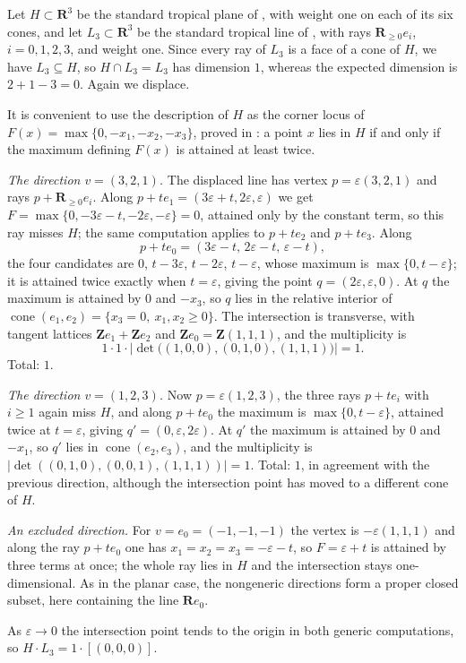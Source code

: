 \begin{example}
\label{ex:ch10-plane-line-r3}
Let $H\subset\mathbf R^3$ be the standard tropical plane of
, with weight one on each of its six cones, and
let $L_3\subset\mathbf R^3$ be the standard tropical line of
, with rays $\mathbf R_{\geq0}e_i$,
$i=0,1,2,3$, and weight one.  Since every ray of $L_3$ is a face of a cone of
$H$, we have $L_3\subseteq H$, so $H\cap L_3=L_3$ has dimension $1$, whereas
the expected dimension is $2+1-3=0$.  Again we displace.

It is convenient to use the description of $H$ as the corner locus of
$F(x)=\max\{0,-x_1,-x_2,-x_3\}$, proved in
: a point $x$ lies in $H$ if and only if the
maximum defining $F(x)$ is attained at least twice.

\emph{The direction $v=(3,2,1)$.}  The displaced line has vertex
$p=\varepsilon(3,2,1)$ and rays $p+\mathbf R_{\geq0}e_i$.  Along
$p+te_1=(3\varepsilon+t,2\varepsilon,\varepsilon)$ we get
$F=\max\{0,-3\varepsilon-t,-2\varepsilon,-\varepsilon\}=0$, attained only by
the constant term, so this ray misses $H$; the same computation applies to
$p+te_2$ and $p+te_3$.  Along
\[
 p+te_0=(3\varepsilon-t,\,2\varepsilon-t,\,\varepsilon-t),
\]
the four candidates are $0$, $t-3\varepsilon$, $t-2\varepsilon$,
$t-\varepsilon$, whose maximum is $\max\{0,t-\varepsilon\}$; it is attained
twice exactly when $t=\varepsilon$, giving the point
$q=(2\varepsilon,\varepsilon,0)$.  At $q$ the maximum is attained by $0$ and
$-x_3$, so $q$ lies in the relative interior of
$\operatorname{cone}(e_1,e_2)=\{x_3=0,\ x_1,x_2\geq0\}$.  The intersection
is transverse, with tangent lattices $\mathbf Ze_1+\mathbf Ze_2$ and
$\mathbf Ze_0=\mathbf Z(1,1,1)$, and the multiplicity is
\[
 1\cdot1\cdot
 \bigl|\det\bigl((1,0,0),(0,1,0),(1,1,1)\bigr)\bigr|
 =1 .
\]
Total: $1$.

\emph{The direction $v=(1,2,3)$.}  Now $p=\varepsilon(1,2,3)$, the three rays
$p+te_i$ with $i\geq1$ again miss $H$, and along $p+te_0$ the maximum is
$\max\{0,t-\varepsilon\}$, attained twice at $t=\varepsilon$, giving
$q'=(0,\varepsilon,2\varepsilon)$.  At $q'$ the maximum is attained by $0$
and $-x_1$, so $q'$ lies in $\operatorname{cone}(e_2,e_3)$, and the
multiplicity is
$|\det((0,1,0),(0,0,1),(1,1,1))|=1$.  Total: $1$, in agreement with the
previous direction, although the intersection point has moved to a different
cone of $H$.

\emph{An excluded direction.}  For $v=e_0=(-1,-1,-1)$ the vertex is
$-\varepsilon(1,1,1)$ and along the ray $p+te_0$ one has
$x_1=x_2=x_3=-\varepsilon-t$, so $F=\varepsilon+t$ is attained by three
terms at once; the whole ray lies in $H$ and the intersection stays
one-dimensional.  As in the planar case, the nongeneric directions form a
proper closed subset, here containing the line $\mathbf Re_0$.

As $\varepsilon\to0$ the intersection point tends to the origin in both
generic computations, so $H\cdot L_3=1\cdot[(0,0,0)]$.
\end{example}

